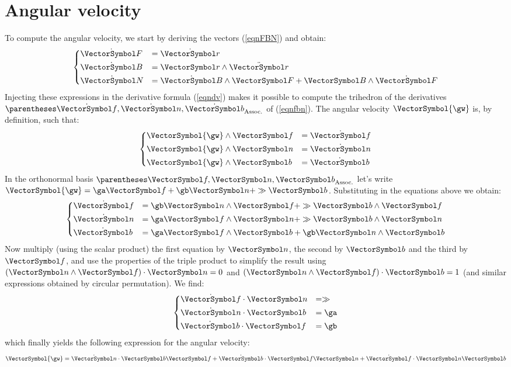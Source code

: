 \documentclass[10pt, a4paper, twoside]{basestyle}
\begin{document}
\section*{Angular velocity}
To compute the angular velocity, we start by deriving the vectors (\ref{eqnFBN}) and obtain:
\begin{equation}
\begin{dcases}
\dot{\vF} &= \dot{\vr} \\
\dot{\vB} &= \vr \wedge \ddot{\vr} \\
\dot{\vN} &= \dot{\vB} \wedge \vF + \vB \wedge \dot{\vF}
\end{dcases}
\label{eqndFBN}
\end{equation}
Injecting these expressions in the derivative formula (\ref{eqndv}) makes it possible to compute the trihedron of the derivatives $\pa{\dot{\vf}, \dot{\vn}, \dot{\vb}}$ of (\ref{eqnfbn}).  The angular velocity $\VectorSymbol{\gw}$ is, by definition, such that:
\[
\begin{dcases}
\VectorSymbol{\gw} \wedge \vf &= \dot{\vf} \\
\VectorSymbol{\gw} \wedge \vn &= \dot{\vn} \\
\VectorSymbol{\gw} \wedge \vb &= \dot{\vb}
\end{dcases}
\]
In the orthonormal basis $\pa{\vf, \vn, \vb}$ let's write $\VectorSymbol{\gw} = \ga \vf + \gb \vn + \gg \vb$.  Substituting in the equations above we obtain:
\[
\begin{dcases}
\dot{\vf} &= \gb \vn \wedge \vf + \gg \vb \wedge \vf \\
\dot{\vn} &= \ga \vf \wedge \vn + \gg \vb \wedge \vn \\
\dot{\vb} &= \ga \vf \wedge \vb + \gb \vn \wedge \vb
\end{dcases}
\]
Now multiply (using the scalar product) the first equation by $\vn$, the second by $\vb$ and the third by $\vf$, and use the properties of the triple product to simplify the result using $\scal{(\vn \wedge \vf)}{\vn} = 0$ and $\scal{(\vn \wedge \vf)}{\vb} = 1$ (and similar expressions obtained by circular permutation).  We find:
\[
\begin{dcases}
\scal{\dot{\vf}}{\vn} &= \gg \\
\scal{\dot{\vn}}{\vb} &= \ga \\
\scal{\dot{\vb}}{\vf} &= \gb
\end{dcases}
\]
which finally yields the following expression for the angular velocity:
\[
\VectorSymbol{\gw} = \pascal{\scal{\dot{\vn}}{\vb}} \vf + \pascal{\scal{\dot{\vb}}{\vf}} \vn + \pascal{\scal{\dot{\vf}}{\vn}} \vb
\]
\end{document}
